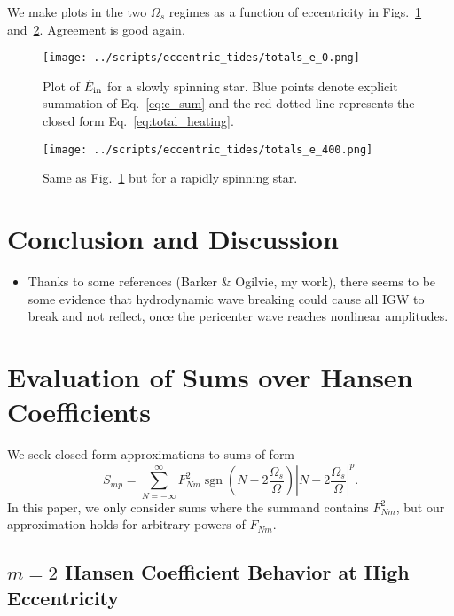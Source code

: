 \documentclass[
        fleqn,
        usenatbib,
        referee,
    ]{mnras}
\newcommand*{\abs}[1]{\left|#1\right|}
\newcommand*{\p}[1]{\left(#1\right)}
\DeclareMathOperator*{\sgn}{sgn}
\begin{document}
We make plots in the two $\Omega_s$ regimes as a function of eccentricity in
Figs.~\ref{fig:e0} and~\ref{fig:e400}. Agreement is good again.
\begin{figure}
    \centering
    \texttt{[image: ../scripts/eccentric\_tides/totals\_e\_0.png]}
    \caption{Plot of $\dot{E}_{\rm in}$ for a slowly spinning star. Blue points
    denote explicit summation of Eq.~\eqref{eq:e_sum} and the red dotted line
    represents the closed form Eq.~\eqref{eq:total_heating}.}\label{fig:e0}
\end{figure}
\begin{figure}
    \centering
    \texttt{[image: ../scripts/eccentric\_tides/totals\_e\_400.png]}
    \caption{Same as Fig.~\ref{fig:e0} but for a rapidly spinning
    star.}\label{fig:e400}
\end{figure}

\section{Conclusion and Discussion}\label{s:disc}

\begin{itemize}
    \item Thanks to some references (Barker \& Ogilvie, my work), there seems to
        be some evidence that hydrodynamic wave breaking could cause all IGW to
        break and not reflect, once the pericenter wave reaches nonlinear
        amplitudes.
\end{itemize}

\appendix

\section{Evaluation of Sums over Hansen Coefficients}\label{app:hansens}

We seek closed form approximations to sums of form
\begin{equation}
    S_{mp} = \sum\limits_{N = -\infty}^\infty
        F_{Nm}^2 \sgn\p{N - 2\frac{\Omega_s}{\Omega}}
            \abs{N - 2\frac{\Omega_s}{\Omega}}^p.\label{eq:gen_sum}
\end{equation}
In this paper, we only consider sums where the summand contains $F_{Nm}^2$, but
our approximation holds for arbitrary powers of $F_{Nm}$.

\subsection{$m=2$ Hansen Coefficient Behavior at High Eccentricity}
\end{document}
